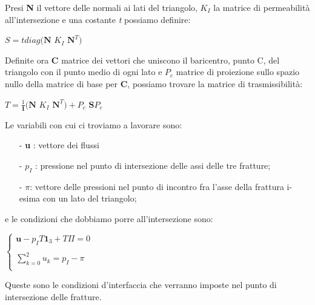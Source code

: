 Presi \textbf{N} il vettore delle normali ai lati del triangolo, \textbf{$K_{I}$} la matrice di permeabilit\`{a} all'intersezione e una costante \textit{t} possiamo definire:
\begin{center}
	$ S = \textit{t}diag( \textbf{N}$ \textbf{$K_{I}$} $ \textbf{N}^{T} ) $
\end{center}
Definite ora \textbf{C} matrice dei vettori che uniscono il baricentro, punto C, del triangolo con il punto medio  di ogni lato e \textbf{$P_{c}$} matrice di proiezione sullo spazio nullo della matrice di base per \textbf{C}, possiamo trovare la matrice di trasmissibilit\`{a}:
\begin{center}
	$ T = \frac{1}{\textbf{I}}( \textbf{N}$ \textbf{$K_{I}$} $ \textbf{N}^{T} ) + $\textbf{$P_{c}$} $\textbf{S}$\textbf{$P_{c}$}
\end{center}
Le variabili con cui ci troviamo a lavorare sono:
	\begin{enumerate}
	\item[-] \textbf{u} : vettore dei flussi
	\item[-] $p_{I}$ :  pressione nel punto di intersezione delle assi delle tre fratture;
	\item[-] \textbf{$\pi$}: vettore delle pressioni nel punto di incontro fra l'asse della frattura i-esima con un lato del triangolo;
	\end{enumerate} 
e le condizioni che dobbiamo porre all'intersezione sono:
\begin{center}			
	$\left \{
		\begin{array}{l}	
	 		\textbf{u} - p_{I}T\textbf{1}_{3}+T\Pi=0  \\ \\
     	 	\sum_{k=0}^2 u_{k} = p_{I} - \pi  \\
		\end{array}
	\right.$
\end{center}

Queste sono le condizioni d'interfaccia che verranno imposte nel punto di intersezione delle fratture.

